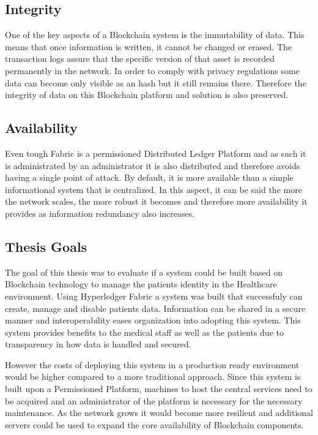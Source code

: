 \subsection{Integrity}

One of the key aspects of a Blockchain system is the immutability of data. This
means that once information is written, it cannot be changed or erased. The
transaction logs assure that the specific version of that asset is recorded
permanently in the network. In order to comply with privacy regulations some
data can become only visible as an hash but it still remains there. Therefore
the integrity of data on this Blockchain platform and solution is also
preserved.

\subsection{Availability}

Even tough Fabric is a permissioned Distributed Ledger Platform and as such it
is administrated by an administrator it is also distributed and therefore
avoids having a single point of attack. By default, it is more available than a
simple informational system that is centralized. In this aspect, it can be said
the more the network scales, the more robust it becomes and therefore more
availability it provides as information redundancy also increases.

\subsection{Thesis Goals}

The goal of this thesis was to evaluate if a system could be built based on
Blockchain technology to manage the patients identity in the Healthcare
environment. Using Hyperledger Fabric a system was built that successfuly can
create, manage and disable patients data. Information can be shared in a secure
manner and interoperability eases organization into adopting this system. This
system provides benefits to the medical staff as well as the patients due to
transparency in how data is handled and secured.

However the costs of deploying this system in a production ready environment
would be higher compared to a more traditional approach. Since this system is
built upon a Permissioned Platform, machines to host the central services need
to be acquired and an administrator of the platform is necessary for the
necessary maintenance. As the network grows it would become more resilient and
additional servers could be used to expand the core availability of Blockchain
components.


